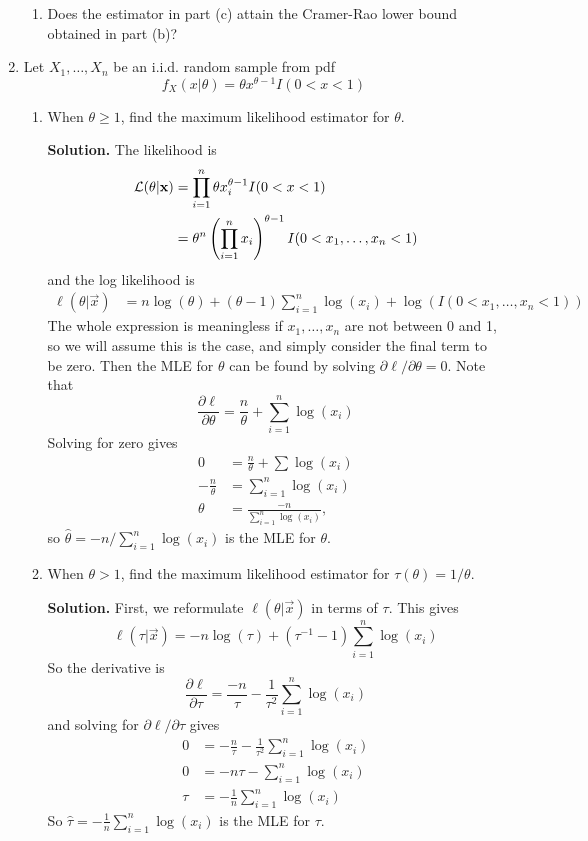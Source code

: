 \documentclass[titlepage]{article}
\begin{document}
\begin{enumerate}
\begin{enumerate}
  \item Does the estimator in part (c) attain the Cramer-Rao lower bound obtained in part (b)?
  \end{enumerate}

\item Let $X_1, \ldots, X_n$ be an i.i.d. random sample from pdf
  \[f_X(x | \theta) = \theta x^{\theta - 1} I(0 < x < 1)\]
  \begin{enumerate}
  \item When $\theta \geq 1$, find the maximum likelihood estimator for $\theta$.

  \textbf{Solution.} The likelihood is
    \[\begin{aligned}
    \mathcal{L}(\theta | \mathbf{x}) &= \prod_{i=1}^n \theta x_i^{\theta - 1} I(0<x<1) \\
    &= \theta^n \left( \prod_{i=1}^n x_i \right)^{\theta - 1} I(0 < x_1, \ldots, x_n < 1)
    \end{aligned}\]
  and the log likelihood is
    \[\begin{aligned}
    \ell(\theta | \vec{x}) &= n\log(\theta) + (\theta - 1) \sum_{i=1}^n \log(x_i) + \log(I(0<x_1, \ldots, x_n < 1))
    \end{aligned}\]
  The whole expression is meaningless if $x_1, \ldots, x_n$ are not between 0 and 1, so we will assume this is the case, and simply consider the final term to be zero. Then the MLE for $\theta$ can be found by solving $\partial \ell/\partial \theta = 0$. Note that
  \[\frac{\partial \ell}{\partial \theta} = \frac{n}{\theta} + \sum_{i=1}^n \log(x_i)\]
  Solving for zero gives
  \[\begin{aligned}
  0 &= \frac{n}{\theta} + \sum\log(x_i) \\
  -\frac{n}{\theta} &= \sum_{i=1}^n \log(x_i) \\
  \theta &= \frac{-n}{\sum_{i=1}^n \log(x_i)},
  \end{aligned}\]
  so $\hat{\theta} = -n/\sum_{i=1}^n \log(x_i)$ is the MLE for $\theta$.
  \item When $\theta > 1$, find the maximum likelihood estimator for $\tau(\theta) = 1/\theta$.

  \textbf{Solution.} First, we reformulate $\ell(\theta | \vec{x})$ in terms of $\tau$. This gives
    \[\ell(\tau|\vec{x}) = -n \log(\tau) + (\tau^{-1} - 1)\sum_{i=1}^n \log(x_i)\]
  So the derivative is
    \[\frac{\partial \ell}{\partial \tau} = \frac{-n}{\tau} - \frac{1}{\tau^2} \sum_{i=1}^n \log(x_i)\]
  and solving for $\partial \ell / \partial \tau$ gives
    \[\begin{aligned}
    0 &= -\frac{n}{\tau} - \frac{1}{\tau^2} \sum_{i=1}^n \log(x_i) \\
    0 &= -n\tau - \sum_{i=1}^n \log(x_i) \\
    \tau &= -\frac{1}{n}\sum_{i=1}^n \log(x_i)
    \end{aligned}\]
  So $\hat{\tau} = -\frac{1}{n}\sum_{i=1}^n \log(x_i)$ is the MLE for $\tau$.


\end{enumerate}
\end{enumerate}
\end{document}
